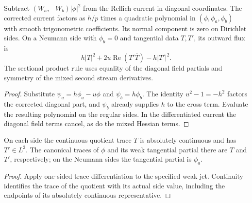 \begin{lemma}
\label{lem:mixed-rellich-current}
\leanok
Subtract $(W_a,-W_b)|\phi|^2$ from the Rellich current in diagonal
coordinates. The corrected current factors as $h/p$ times a quadratic
polynomial in $(\phi,\phi_a,\phi_b)$ with smooth trigonometric coefficients.
Its normal component is zero on Dirichlet sides. On a Neumann side with
$\phi_b=0$ and tangential data $T,T'$, its outward flux is
\[
  h|T|^2+2u\operatorname{Re}(T'\bar T)-h|T'|^2 .
\]
The sectional product rule uses equality of the diagonal field partials
and symmetry of the mixed second stream derivatives.
\end{lemma}

\begin{proof}
\leanok
Substitute $\psi_a=h\phi_a-u\phi$ and $\psi_b=h\phi_b$.
The identity $u^2-1=-h^2$ factors the corrected diagonal part, and
$\psi_b$ already supplies $h$ to the cross term. Evaluate the resulting
polynomial on the regular sides. In the differentiated current the
diagonal field terms cancel, as do the mixed Hessian terms.
\end{proof}

\begin{lemma}
\label{lem:mixed-quotient-neumann-traces}
\leanok
On each side the continuous quotient trace $T$ is absolutely continuous
and has $T'\in L^2$. The canonical traces of $\phi$ and its weak
tangential partial there are $T$ and $T'$, respectively; on the
Neumann sides the tangential partial is $\phi_a$.
\end{lemma}

\begin{proof}
\leanok
Apply one-sided trace differentiation to the specified weak jet.
Continuity identifies the trace of the quotient with its actual side
value, including the endpoints of its absolutely continuous representative.
\end{proof}

